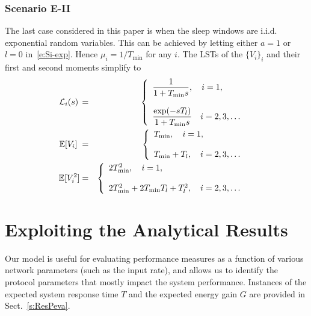 \documentclass[journal]{IEEEtran}
\newcommand {\barr} {\begin{array}}
\newcommand {\earr} {\end{array}}
\newcommand {\bears} {\begin{eqnarray*}}
\newcommand {\eears} {\end{eqnarray*}}
\def \E{{\mathbb E}}
\begin{document}
\subsubsection*{Scenario E-II}
The last case considered in this paper is when the sleep windows
are i.i.d. exponential random variables. This can be achieved by
letting either $a=1$ or $l=0$ in~\eqref{e:Si-exp}. Hence
$\mu_i=1/T_{\min}$ for any $i$. The LSTs of the $\{V_i\}_i$ and their
first and second moments simplify to
\bears
{\cal L}_i(s)\,&=&\left\{
\barr{ll}
\displaystyle{\frac{1}{1+T_{\min}s}}, \quad i=1,\\
&\\
\displaystyle{\frac{\exp(-sT_l)}{1+T_{\min}s}}\quad i=2,3,\ldots\\
\earr\right. \\
\E[V_i]\;&=&\left\{
\barr{ll}
T_{\min},\quad i=1,\\
&\\
T_{\min}+T_l,\quad i=2,3,\ldots\\
\earr\right.\\
\E[V_i^2]&=&\left\{
\barr{ll}
2T_{\min}^2, \quad i=1,\\
&\\
2T_{\min}^2+2T_{\min}T_l+T_l^2 ,\quad i=2,3,\ldots\\
\earr\right.
\eears
\section{Exploiting the Analytical Results}
\label{s:exploit}
Our model is useful for evaluating performance measures as a function of various network parameters (such as the input rate), and allows us to identify the protocol parameters that mostly impact the system performance. Instances of the expected system response time $T$ and the expected energy gain $G$ are provided in Sect.~\ref{s:ResPeva}.
\end{document}
